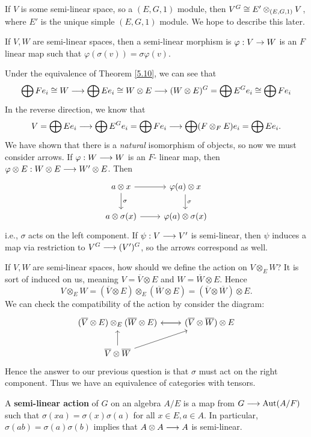 If $V$ is some semi-linear space, so a $(E,G,1)$ module, then $V^G \cong E' \otimes_{(E,G,1)} V$, where $E'$ is the unique simple $(E,G,1) $ module. We hope to describe this later.
\begin{defn}\label{5.11}

If $V,W$ are semi-linear spaces, then a semi-linear morphism is $\varphi : V \rightarrow W$ is an $F$ linear map such that $\varphi (\sigma (v))  = \sigma \varphi (v)$. 
\end{defn}
Under the equivalence of Theorem \ref{5.10}, we can see that 
$$\bigoplus Fe_i \cong W \longrightarrow \bigoplus Ee_i \cong W\otimes E \longrightarrow (W\otimes E)^G = \bigoplus E^Ge_i \cong \bigoplus Fe_i$$
In the reverse direction, we know that $$V = \bigoplus Ee_i \longrightarrow \bigoplus E^Ge_i = \bigoplus Fe_i \longrightarrow \bigoplus (F\otimes_F E)e_i = \bigoplus Ee_i.$$
We have shown that there is a \textit{natural} isomorphism of objects, so now we must consider arrows. If $\varphi : W \longrightarrow W$ is an $F$- linear map, then $\varphi \otimes E : W\otimes E \longrightarrow W'\otimes E$. Then
$$
\begin{tikzcd}
a\otimes x \arrow{r}\arrow{d}{\sigma} & \varphi (a) \otimes x \arrow{d}{\sigma}\\
a\otimes \sigma (x) \arrow{r} & \varphi(a) \otimes \sigma (x)
\end{tikzcd}
$$
i.e., $\sigma$ acts on the left component. If $\psi : V \longrightarrow V'$ is semi-linear, then $\psi$ induces a map via restriction to $V^G \longrightarrow (V')^G$, so the arrows correspond as well.

If $V,W$ are semi-linear spaces, how should we define the action on $V \otimes_E W$? It is sort of induced on us, meaning $V = \overline{V} \otimes E$ and $W = \overline{W} \otimes E$. Hence 
$$V \otimes_E W = (\overline{V} \otimes E) \otimes_E (\overline{W} \otimes E )= (\overline{V} \otimes \overline{W}) \otimes E.$$
We can check the compatibility of the action by consider the diagram:
$$
\begin{tikzcd}
(\overline{V} \otimes E) \otimes_E (\overline{W} \otimes E) \arrow{r} &  (\overline{V} \otimes \overline{W}) \otimes E \arrow{l} \\
\overline{V} \otimes \overline{W} \arrow{u}\arrow{ru} & {}
\end{tikzcd}
$$
Hence the answer to our previous question is that $\sigma$ must act on the right component. Thus we have an equivalence of categories with tensors.

\begin{defn}\label{5.12}
A \textbf{semi-linear action} of $G$ on an algebra $A/E$ is a map from $G \longrightarrow \operatorname{Aut} (A/F)$ such that $\sigma (xa) = \sigma (x)\sigma (a)$ for all $x\in E, a \in A$. In particular, $\sigma (ab) = \sigma (a)\sigma (b)$ implies that $A \otimes A \longrightarrow A$ is semi-linear.
\end{defn}

